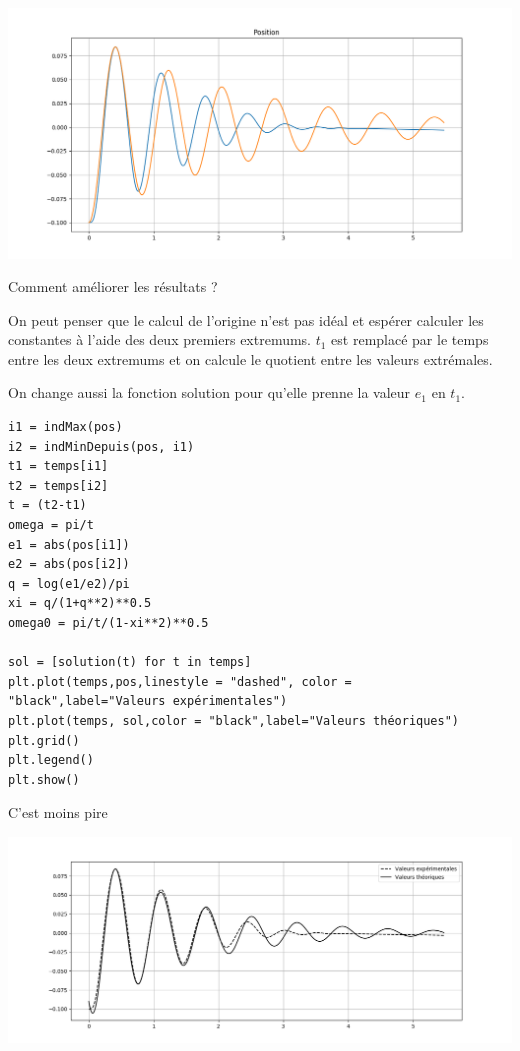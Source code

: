 \begin{center}
\includegraphics[scale=0.5]{Images/14_identification}
\end{center}
\begin{Exercise}[title={Question ouverte}]\it 

Comment améliorer les résultats ? 
\end{Exercise}
\begin{Answer}
On peut penser que le calcul de l'origine n'est pas idéal et espérer calculer les constantes à l'aide des deux premiers extremums. $t_1$ est remplacé par le temps entre les deux extremums et on calcule le quotient entre les valeurs extrémales.

On change aussi la fonction solution pour qu'elle prenne la valeur $e_1$ en $t_1$.
\begin{lstlisting}
i1 = indMax(pos)
i2 = indMinDepuis(pos, i1)
t1 = temps[i1]
t2 = temps[i2]
t = (t2-t1)
omega = pi/t
e1 = abs(pos[i1])
e2 = abs(pos[i2])
q = log(e1/e2)/pi
xi = q/(1+q**2)**0.5
omega0 = pi/t/(1-xi**2)**0.5

sol = [solution(t) for t in temps]
plt.plot(temps,pos,linestyle = "dashed", color = "black",label="Valeurs expérimentales")
plt.plot(temps, sol,color = "black",label="Valeurs théoriques")
plt.grid()
plt.legend()
plt.show()
\end{lstlisting}
C'est moins pire
\begin{center}
\includegraphics[scale=0.5]{Images/14_identification2}
\end{center}

\end{Answer}